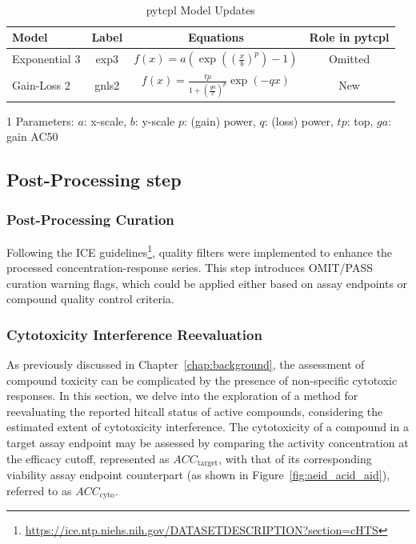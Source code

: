 \begin{table}
    \caption{pytcpl Model Updates}~\label{table:pytcpl_models}
    \centering
    \begin{threeparttable}[b]
    \renewcommand{\arraystretch}{1.4}
    \begin{tabular}{lccc}
    \toprule
    \textbf{Model} & \textbf{Label} & \textbf{Equations\tnote{1}} & \textbf{Role in pytcpl} \\
    \midrule
    Exponential 3 & exp3 & \(f(x) = a\left(\exp\left({\left(\frac{x}{b}\right)}^{p}\right) - 1\right)\) & Omitted \\
    Gain-Loss 2 & gnls2 & \(f(x) = \frac{tp}{1 + {\left(\frac{ga}{x}\right)}^{p}}\exp\left({-qx}\right)\) & New \\
    \bottomrule
    \end{tabular}
    \begin{tablenotes}
        \item [1] Parameters: $a$: x-scale, $b$: y-scale $p$: (gain) power, $q$: (loss) power, $tp$: top, $ga$: gain AC50
    \end{tablenotes}
\end{threeparttable}
\end{table}

\subsection{Post-Processing step}
\subsubsection{Post-Processing Curation}
Following the ICE guidelines\footnote{\url{https://ice.ntp.niehs.nih.gov/DATASETDESCRIPTION?section=cHTS}}, quality filters were implemented to enhance the processed concentration-response series. This step introduces OMIT/PASS curation warning flags, which could be applied either based on assay endpoints or compound quality control criteria.

\subsubsection{Cytotoxicity Interference Reevaluation}
As previously discussed in Chapter~\ref{chap:background}, the assessment of compound toxicity can be complicated by the presence of non-specific cytotoxic responses. In this section, we delve into the exploration of a method for reevaluating the reported hitcall status of active compounds, considering the estimated extent of cytotoxicity interference. The cytotoxicity of a compound in a target assay endpoint may be assessed by comparing the activity concentration at the efficacy cutoff, represented as $ACC_{\text{target}}$, with that of its corresponding viability assay endpoint counterpart (as shown in Figure~\ref{fig:aeid_acid_aid}), referred to as $ACC_{\text{cyto}}$. 

